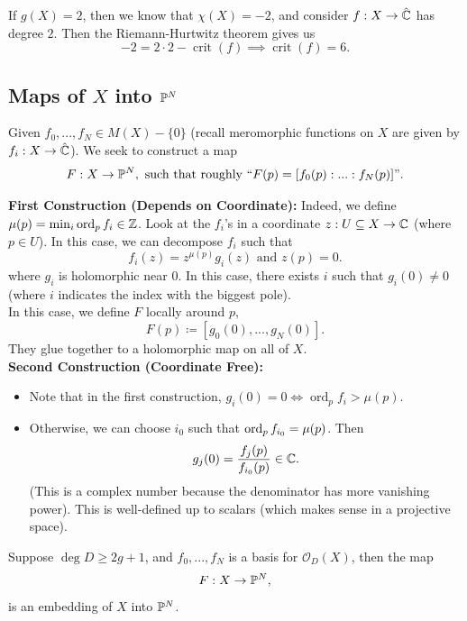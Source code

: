 \documentclass{article}
\begin{document}
{\begin{corollary}
    If $g(X) = 2$, then we know that $\chi(X) = -2$, and consider $f: X \to \hat{\mathbb{C}}$ has degree $2$. Then the Riemann-Hurtwitz theorem gives us
    \[-2 = 2 \cdot 2 - \operatorname{crit}(f) \implies \operatorname{crit}(f) = 6.\]
\end{corollary}


\subsection{Maps of $X$ into $\mathbb{P}^N$}

Given $f_0, ..., f_N \in M(X) - \{0\}$ (recall meromorphic functions on $X$ are given by $f_i: X \to \hat{\mathbb{C}}$). We seek to construct a map
\[F: X \to \mathbb{P}^N, \text{ such that roughly } ``F(p) = [f_0(p): ... : f_N(p)]".\]

\textbf{First Construction (Depends on Coordinate): }
Indeed, we define $\mu(p) = \min_{i} \operatorname{ord}_p f_i \in \mathbb{Z}$. Look at the $f_i$'s in a coordinate $z: U \subseteq X \to \mathbb{C}$ (where $p \in U$). In this case, we can decompose $f_i$ such that
\[f_i(z) = z^{\mu(p)} g_i(z) \text{ and } z(p) = 0.\]
where $g_i$ is holomorphic near $0$. In this case, there exists $i$ such that $g_i(0) \neq 0$ (where $i$ indicates the index with the biggest pole).\\

In this case, we define $F$ locally around $p$, 
\[F(p) \coloneqq [g_0(0), ..., g_N(0)].\]
They glue together to a holomorphic map on all of $X$.\\

\textbf{Second Construction (Coordinate Free): }
\begin{itemize}
    \item Note that in the first construction, $g_i(0) = 0 \iff \operatorname{ord}_p f_i > \mu(p)$.
    \item Otherwise, we can choose $i_0$ such that $\operatorname{ord}_{p} f_{i_0} = \mu(p)$. Then
    \[g_j(0) = \frac{f_j(p)}{f_{i_0}(p)} \in \mathbb{C}. \]
    (This is a complex number because the denominator has more vanishing power). This is well-defined up to scalars (which makes sense in a projective space).
\end{itemize}

\begin{theorem}
    Suppose $\deg D \geq 2g + 1$, and $f_0, ..., f_N$ is a basis for $\mathcal{O}_D(X)$, then the map
    \[F: X \to \mathbb{P}^{N},\]
    is an embedding of $X$ into $\mathbb{P}^N$.
\end{theorem}

}
\end{document}
